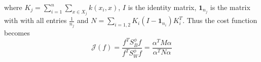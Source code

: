 where $K_j = \sum_{i=1}^n \sum_{x \in X_j} k(x_i, x)$, $I$ is the identity matrix, $\bm{1}_{n_j}$ is the matrix with with all entries $\frac{1}{n_j}$ and $N = \sum_{i=1,2} K_i(I - \bm{1}_{n_i})K_i^T$. Thus the cost function becomes
\[\mathcal{J}(f) = \frac{f^TS_B^{\phi}f}{f^TS_W^{\phi}f} = \frac{\alpha^T M \alpha}{\alpha^T N \alpha} \]
